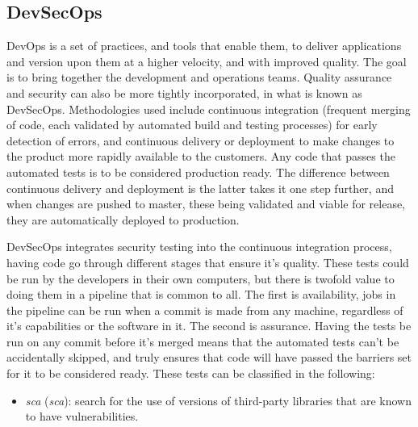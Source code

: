 \documentclass[11pt]{article}
\begin{document}
\begin{flushleft}

    \clearpage
    \subsection{DevSecOps}
    DevOps is a set of practices, and tools that enable them, to deliver applications and version upon them at a higher velocity, and with improved quality. The goal is to bring together the development and operations teams. Quality assurance and security can also be more tightly incorporated, in what is known as DevSecOps. Methodologies used include continuous integration (frequent merging of code, each validated by automated build and testing processes) for early detection of errors, and continuous delivery or deployment to make changes to the product more rapidly available to the customers. Any code that passes the automated tests is to be considered production ready. The difference between continuous delivery and deployment is the latter takes it one step further, and when changes are pushed to master, these being validated and viable for release, they are automatically deployed to production.
    \linebreak

    DevSecOps integrates security testing into the continuous integration process, having code go through different stages that ensure it's quality. These tests could be run by the developers in their own computers, but there is twofold value to doing them in a pipeline that is common to all. The first is availability, jobs in the pipeline can be run when a commit is made from any machine, regardless of it's capabilities or the software in it. The second is assurance. Having the tests be run on any commit before it's merged means that the automated tests can't be accidentally skipped, and truly ensures that code will have passed the barriers set for it to be considered ready. These tests can be classified in the following:
    \linebreak

        \begin{itemize}
            \itemsep0em 
            \item \textit{\acrlong{sca}} (\textit{\acrshort{sca}}): search for the use of versions of third-party libraries that are known to have vulnerabilities.


\end{itemize}
\end{flushleft}
\end{document}
